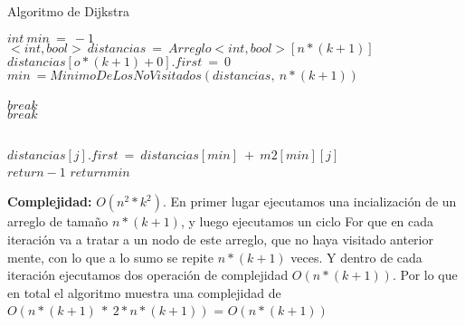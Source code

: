 \documentclass{article}
\begin{document}
\begin{algorithm}[h!]
  \caption{Algoritmo de Dijkstra}
\begin{algorithmic}
	\State $int \  min \ = \ -1$
	\State $<int,bool> \ distancias \ = \ Arreglo<int,bool> [n*(k+1)]$ 
	\State $distancias[o *(k+1) + 0].first\ =\ 0 $ \\ 
		 \State $min \ = MinimoDeLosNoVisitados(distancias,\ n*(k+1))$ \\ \\ 
		\State $break$ \\ 
		\State $break$ 
		\EndIf	
		\\
		 \\ 
		
			 
					\State $distancias[j].first\ = \ distancias[min]\ +\ m2[min][j]$ \\ 				
				\EndIf
			\EndIf		
		\EndFor
		\medskip
		 
		\State $return -1$ 
		\Else
		\State $return min$
		\EndIf
	\EndFor
 	
\end{algorithmic}
 \par{\textbf{Complejidad:} $O(n^2*k^2)$. En primer lugar ejecutamos una incialización de un arreglo de tamaño $n*(k+1)$, y luego ejecutamos un ciclo For que en cada iteración va a tratar a un nodo de este arreglo, que no haya visitado anterior mente, con lo que a lo sumo se repite $n*(k+1)$ veces. Y dentro de cada iteración ejecutamos dos operación de complejidad $O(n*(k+1))$. Por lo que en total el algoritmo muestra una complejidad de $O(n*(k+1)\  *\ 2*n*(k+1))$ = $O(n*(k+1))$} 
\end{algorithm}
\end{document}

